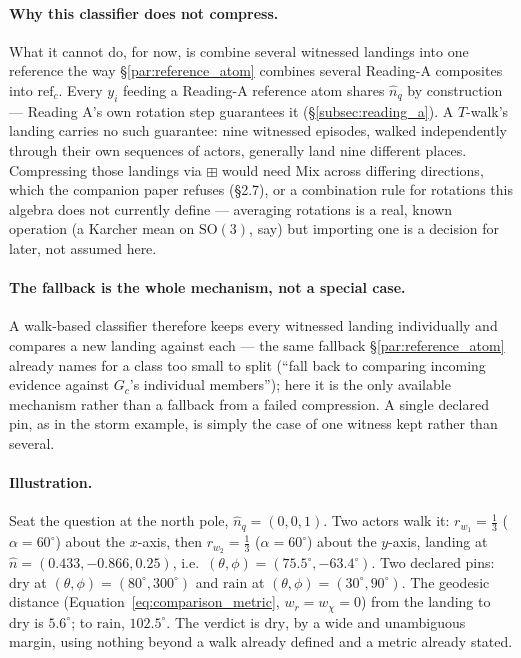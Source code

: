 \documentclass[12pt, a4paper]{article}
\begin{document}
\paragraph{Why this classifier does not compress.}
What it cannot do, for now, is combine several witnessed landings
into one reference the way \S\ref{par:reference_atom} combines
several Reading-A composites into $\mathrm{ref}_c$. Every $y_i$
feeding a Reading-A reference atom shares $\hat n_q$ by construction
--- Reading A's own rotation step guarantees it
(\S\ref{subsec:reading_a}). A $T$-walk's landing carries no such
guarantee: nine witnessed episodes, walked independently through
their own sequences of actors, generally land nine different places.
Compressing those landings via $\boxplus$ would need Mix across differing
directions, which the companion paper refuses (\S2.7), or a combination rule for rotations this algebra
does not currently define --- averaging rotations is a real, known
operation (a Karcher mean on $\mathrm{SO}(3)$, say) but importing one
is a decision for later, not assumed here.

\paragraph{The fallback is the whole mechanism, not a special case.}
A walk-based classifier therefore keeps every witnessed landing
individually and compares a new landing against each --- the same
fallback \S\ref{par:reference_atom} already names for a class too
small to split (``fall back to comparing incoming evidence against
$G_c$'s individual members''); here it is the only available
mechanism rather than a fallback from a failed compression. A single
declared pin, as in the storm example, is simply the case of one
witness kept rather than several.

\paragraph{Illustration.} Seat the question at the north pole,
$\hat n_q=(0,0,1)$. Two actors walk it: $r_{w_1}=\tfrac13$
($\alpha=60^\circ$) about the $x$-axis, then $r_{w_2}=\tfrac13$
($\alpha=60^\circ$) about the $y$-axis, landing at
$\hat n=(0.433,-0.866,0.25)$, i.e.\ $(\theta,\phi)=(75.5^\circ,
-63.4^\circ)$. Two declared pins: $\mathrm{dry}$ at
$(\theta,\phi)=(80^\circ,300^\circ)$ and $\mathrm{rain}$ at
$(\theta,\phi)=(30^\circ,90^\circ)$. The geodesic distance
(Equation~\eqref{eq:comparison_metric}, $w_r=w_\chi=0$) from the
landing to $\mathrm{dry}$ is $5.6^\circ$; to $\mathrm{rain}$,
$102.5^\circ$. The verdict is $\mathrm{dry}$, by a wide and
unambiguous margin, using nothing beyond a walk already defined and a
metric already stated.
\end{document}
